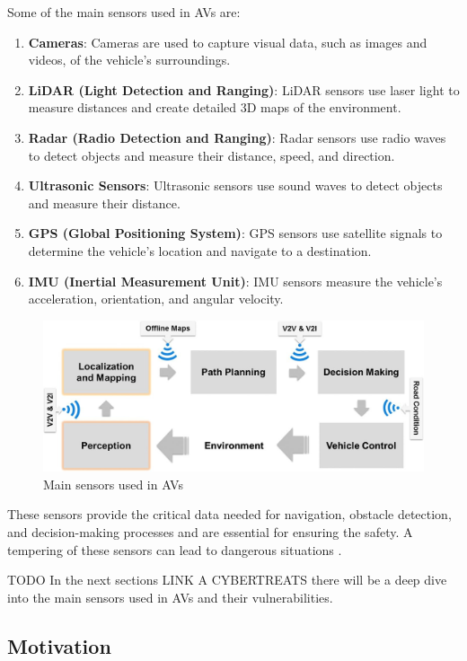 Some of the main sensors used in AVs are:
\begin{enumerate}
    \item \textbf{Cameras}: Cameras are used to capture visual data, such as images and videos, of the vehicle's surroundings.
    \item \textbf{LiDAR (Light Detection and Ranging)}: LiDAR sensors use laser light to measure distances and create detailed 3D maps of the environment.
    \item \textbf{Radar (Radio Detection and Ranging)}: Radar sensors use radio waves to detect objects and measure their distance, speed, and direction.
    \item \textbf{Ultrasonic Sensors}: Ultrasonic sensors use sound waves to detect objects and measure their distance.
    \item \textbf{GPS (Global Positioning System)}: GPS sensors use satellite signals to determine the vehicle's location and navigate to a destination.
    \item \textbf{IMU (Inertial Measurement Unit)}: IMU sensors measure the vehicle's acceleration, orientation, and angular velocity.
\end{enumerate}

\begin{figure}[!htb]
    \centering
    \includegraphics[width=0.7\linewidth]{figures/perception}
    \caption{Main sensors used in AVs}
    \label{fig:sensors}
\end{figure}

These sensors provide the critical data needed for navigation, obstacle
detection, and decision-making processes and are essential for ensuring the safety.
A tempering of these sensors can lead to dangerous situations \cite{unknown2020connected,cybersec} .

TODO In the next sections LINK A CYBERTREATS there will be a deep dive into the main sensors used in AVs and their vulnerabilities.


\subsection{Motivation}\label{subsec:motivation}

